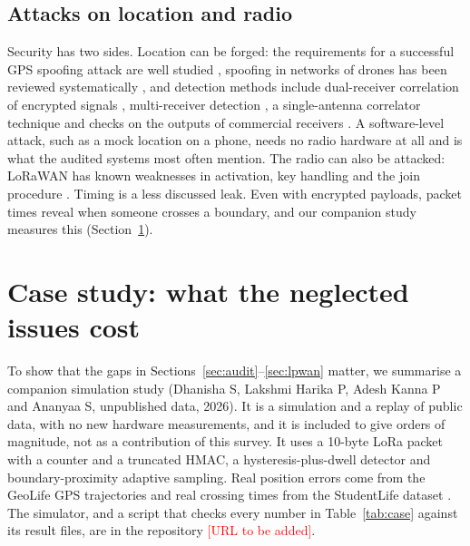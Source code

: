 \documentclass[12pt]{article}
\let\cite\citep
\newcommand{\todo}[1]{\textcolor{red}{[#1]}}
\begin{document}
\subsection{Attacks on location and radio}\label{sec:sec}

Security has two sides. Location can be forged: the requirements for a successful GPS spoofing attack are well studied \cite{tippenhauer2011spoofing,psiaki2016gnss}, spoofing in networks of drones has been reviewed systematically \cite{altaweel2023spoofing}, and detection methods include dual-receiver correlation of encrypted signals \cite{psiaki2013spoofing}, multi-receiver detection \cite{jansen2016multi}, a single-antenna correlator technique \cite{schmidt2020spoofing} and checks on the outputs of commercial receivers \cite{manfredini2018effective}. A software-level attack, such as a mock location on a phone, needs no radio hardware at all and is what the audited systems most often mention. The radio can also be attacked: LoRaWAN has known weaknesses in activation, key handling and the join procedure \cite{yang2018security,aras2017exploring,butun2018security,tomasin2017security,ruotsalainen2022lorawan,hessel2022lorawan}. Timing is a less discussed leak. Even with encrypted payloads, packet times reveal when someone crosses a boundary, and our companion study measures this (Section~\ref{sec:case}).

\section{Case study: what the neglected issues cost}\label{sec:case}
To show that the gaps in Sections~\ref{sec:audit}--\ref{sec:lpwan} matter, we summarise a companion simulation study (Dhanisha S, Lakshmi Harika P, Adesh Kanna P and Ananyaa S, unpublished data, 2026). It is a simulation and a replay of public data, with no new hardware measurements, and it is included to give orders of magnitude, not as a contribution of this survey. It uses a 10-byte LoRa packet with a counter and a truncated HMAC, a hysteresis-plus-dwell detector and boundary-proximity adaptive sampling. Real position errors come from the GeoLife GPS trajectories \cite{zheng2009geolife} and real crossing times from the StudentLife dataset \cite{wang2014studentlife}. The simulator, and a script that checks every number in Table~\ref{tab:case} against its result files, are in the repository \todo{URL to be added}.
\end{document}
